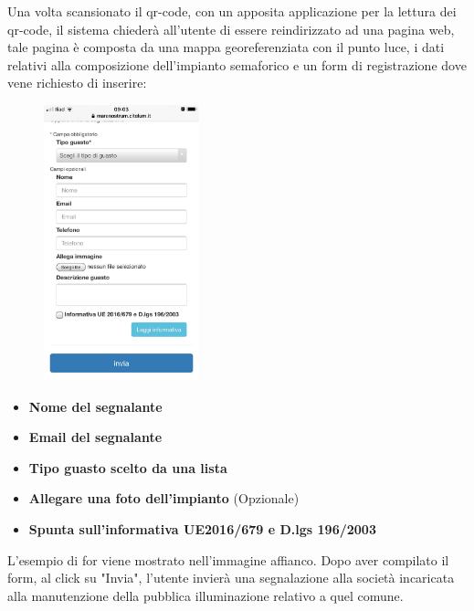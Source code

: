 Una volta scansionato il qr-code, con un apposita applicazione per la lettura dei qr-code, il sistema chiederà all'utente di essere reindirizzato ad una pagina web, tale pagina è composta da una mappa georeferenziata con il punto luce, i dati relativi alla composizione dell'impianto semaforico e un form di registrazione dove vene richiesto di inserire:
\begin{figure}
    \includegraphics[width=0.40\textwidth]{img/faro/qrlonato2.jpg}
\end{figure}
\begin{itemize}
  \item \textbf{Nome del segnalante}
  \item \textbf{Email del segnalante}
  \item \textbf{Tipo guasto scelto da una lista}
  \item \textbf{Allegare una foto dell'impianto} (Opzionale)
  \item \textbf{Spunta sull'informativa UE2016/679 e D.lgs 196/2003}
\end{itemize}

L'esempio di for viene mostrato nell'immagine affianco. Dopo aver compilato il form, al click su "Invia", l'utente invierà una segnalazione alla società incaricata alla manutenzione della pubblica illuminazione relativo a quel comune.


